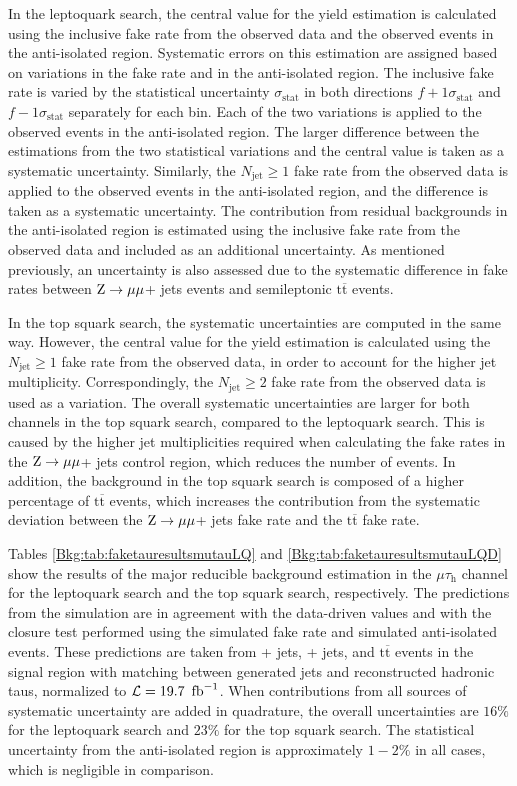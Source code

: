 \documentclass[12pt]{thesis}  %
\newcommand{\tauh}{\ensuremath{\tau_{\text{h}}}\xspace}
\newcommand{\mutau}{\ensuremath{\mu\tauh}\xspace}
\renewcommand{\ttbar}{\ensuremath{\mathrm{t}\overline{\mathrm{t}}}\xspace}
\newcommand{\ra}{\ensuremath{\rightarrow}}%
\newcommand{\Zmm}{\ensuremath{\Z \ra \mu\mu}\xspace}%
\newcommand{\thelumi}{\ensuremath{19.7~\fbinv}\xspace}
\begin{document}
In the leptoquark search, the central value for the yield estimation is calculated using the inclusive fake rate from the observed data and the observed events in the anti-isolated region. Systematic errors on this estimation are assigned based on variations in the fake rate and in the anti-isolated region. The inclusive fake rate is varied by the statistical uncertainty $\sigma_{\text{stat}}$ in both directions $f+1\sigma_{\text{stat}}$ and $f-1\sigma_{\text{stat}}$ separately for each bin. Each of the two variations is applied to the observed events in the anti-isolated region. The larger difference between the estimations from the two statistical variations and the central value is taken as a systematic uncertainty. Similarly, the $N_{\text{jet}} \geq 1$ fake rate from the observed data is applied to the observed events in the anti-isolated region, and the difference is taken as a systematic uncertainty. The contribution from residual backgrounds in the anti-isolated region is estimated using the inclusive fake rate from the observed data and included as an additional uncertainty. As mentioned previously, an uncertainty is also assessed due to the systematic difference in fake rates between \Zmm + jets events and semileptonic \ttbar events.

In the top squark search, the systematic uncertainties are computed in the same way. However, the central value for the yield estimation is calculated using the $N_{\text{jet}} \geq 1$ fake rate from the observed data, in order to account for the higher jet multiplicity. Correspondingly, the $N_{\text{jet}} \geq 2$ fake rate from the observed data is used as a variation. The overall systematic uncertainties are larger for both channels in the top squark search, compared to the leptoquark search. This is caused by the higher jet multiplicities required when calculating the fake rates in the \Zmm + jets control region, which reduces the number of events. In addition, the background in the top squark search is composed of a higher percentage of \ttbar events, which increases the contribution from the systematic deviation between the \Zmm + jets fake rate and the \ttbar fake rate.

Tables \ref{Bkg:tab:faketauresultsmutauLQ} and \ref{Bkg:tab:faketauresultsmutauLQD} show the results of the major reducible background estimation in the \mutau channel for the leptoquark search and the top squark search, respectively. The predictions from the simulation are in agreement with the data-driven values and with the closure test performed using the simulated fake rate and simulated anti-isolated events. These predictions are taken from \W + jets, \Z + jets, and \ttbar events in the signal region with matching between generated jets and reconstructed hadronic taus, normalized to $\lumi = \thelumi$. When contributions from all sources of systematic uncertainty are added in quadrature, the overall uncertainties are $16\%$ for the leptoquark search and $23\%$ for the top squark search. The statistical uncertainty from the anti-isolated region is approximately $1-2\%$ in all cases, which is negligible in comparison.
\end{document}
